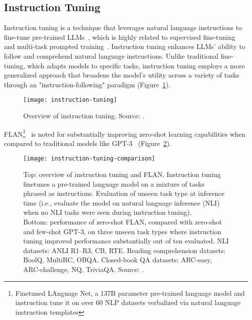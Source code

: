 \subsection{Instruction Tuning}
\label{subsec:instruction-tuning}

Instruction tuning is a technique that leverages natural language instructions to fine-tune pre-trained LLMs~\cite{wei2022fine}, which is highly related to supervised fine-tuning~\cite{ouyang2022training} and multi-task prompted training~\cite{sanhetal2022multitask}.
Instruction tuning enhances LLMs' ability to follow and comprehend natural language instructions.
Unlike traditional fine-tuning, which adapts models to specific tasks, instruction tuning employs a more generalized approach that broadens the model's utility across a variety of tasks through an "instruction-following" paradigm (Figure~\ref{fig:instruction-tuning}).

\begin{figure}[h!]
	\centering
	\texttt{[image: instruction-tuning]}
	\caption{Overview of instruction tuning. Source: \textcite{survey}.}
	\label{fig:instruction-tuning}
\end{figure}

FLAN\footnote{Finetuned LAnguage Net, a 137B parameter pre-trained language model and instruction tune it on over 60 NLP datasets verbalized via natural language instruction templates}~\cite{wei2022fine} is noted for substantially improving zero-shot learning capabilities when compared to traditional models like GPT-3~\cite{brown2020language} (Figure~\ref{fig:instruction-tuning-comparison}).

\begin{figure}[h!]
	\centering
	\texttt{[image: instruction-tuning-comparison]}
	\caption{Top: overview of instruction tuning and FLAN. Instruction tuning finetunes a pre-trained language model on a mixture of tasks phrased as instructions. Evaluation of unseen task type at inference time (i.e., evaluate the model on natural language inference (NLI) when no NLI tasks were seen during instruction tuning).\\
		Bottom: performance of zero-shot FLAN, compared with zero-shot and few-shot GPT-3, on three unseen task types where instruction tuning improved performance substantially out of ten evaluated. NLI datasets: ANLI R1–R3, CB, RTE. Reading comprehension datasets: BoolQ, MultiRC, OBQA. Closed-book QA datasets: ARC-easy, ARC-challenge, NQ, TriviaQA.
		Source: \textcite{wei2022fine}.}
	\label{fig:instruction-tuning-comparison}
\end{figure}


